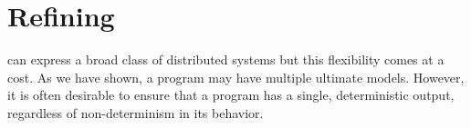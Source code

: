 \section{Refining \large \bf \lang}
\label{sec:confluence}


\lang can express a broad class of distributed systems but this flexibility comes at a cost.
As we have shown, a \lang program may have multiple ultimate models. %
However, it is often desirable to ensure that a program has a single, deterministic output, regardless of non-determinism in its behavior. %



